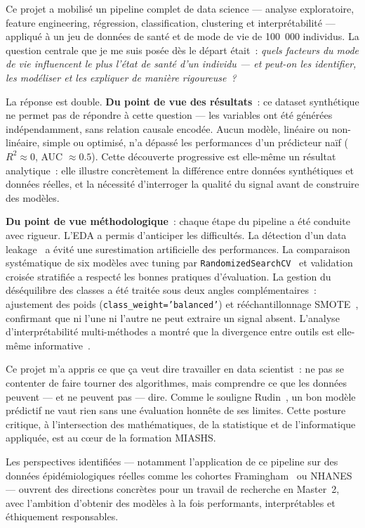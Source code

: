\clearpage

Ce projet a mobilisé un pipeline complet de data science --- analyse exploratoire, feature engineering, régression, classification, clustering et interprétabilité --- appliqué à un jeu de données de santé et de mode de vie de 100~000 individus. La question centrale que je me suis posée dès le départ était~: \textit{quels facteurs du mode de vie influencent le plus l'état de santé d'un individu --- et peut-on les identifier, les modéliser et les expliquer de manière rigoureuse~?}

La réponse est double. \textbf{Du point de vue des résultats}~: ce dataset synthétique ne permet pas de répondre à cette question --- les variables ont été générées indépendamment, sans relation causale encodée. Aucun modèle, linéaire ou non-linéaire, simple ou optimisé, n'a dépassé les performances d'un prédicteur naïf ($R^2 \approx 0$, AUC $\approx 0.5$). Cette découverte progressive est elle-même un résultat analytique~: elle illustre concrètement la différence entre données synthétiques et données réelles, et la nécessité d'interroger la qualité du signal avant de construire des modèles.

\textbf{Du point de vue méthodologique}~: chaque étape du pipeline a été conduite avec rigueur. L'EDA a permis d'anticiper les difficultés. La détection d'un data leakage~\cite{kaufman2012} a évité une surestimation artificielle des performances. La comparaison systématique de six modèles avec tuning par \texttt{RandomizedSearchCV}~\cite{bergstra2012} et validation croisée stratifiée a respecté les bonnes pratiques d'évaluation. La gestion du déséquilibre des classes a été traitée sous deux angles complémentaires~: ajustement des poids (\texttt{class\_weight='balanced'}) et rééchantillonnage SMOTE~\cite{chawla2002}, confirmant que ni l'une ni l'autre ne peut extraire un signal absent. L'analyse d'interprétabilité multi-méthodes a montré que la divergence entre outils est elle-même informative~\cite{rudin2019}.

Ce projet m'a appris ce que ça veut dire travailler en data scientist~: ne pas se contenter de faire tourner des algorithmes, mais comprendre ce que les données peuvent --- et ne peuvent pas --- dire. Comme le souligne Rudin~\cite{rudin2019}, un bon modèle prédictif ne vaut rien sans une évaluation honnête de ses limites. Cette posture critique, à l'intersection des mathématiques, de la statistique et de l'informatique appliquée, est au c\oe ur de la formation MIASHS.

Les perspectives identifiées --- notamment l'application de ce pipeline sur des données épidémiologiques réelles comme les cohortes Framingham~\cite{dawber1951} ou NHANES~\cite{nhanes} --- ouvrent des directions concrètes pour un travail de recherche en Master~2, avec l'ambition d'obtenir des modèles à la fois performants, interprétables et éthiquement responsables.
